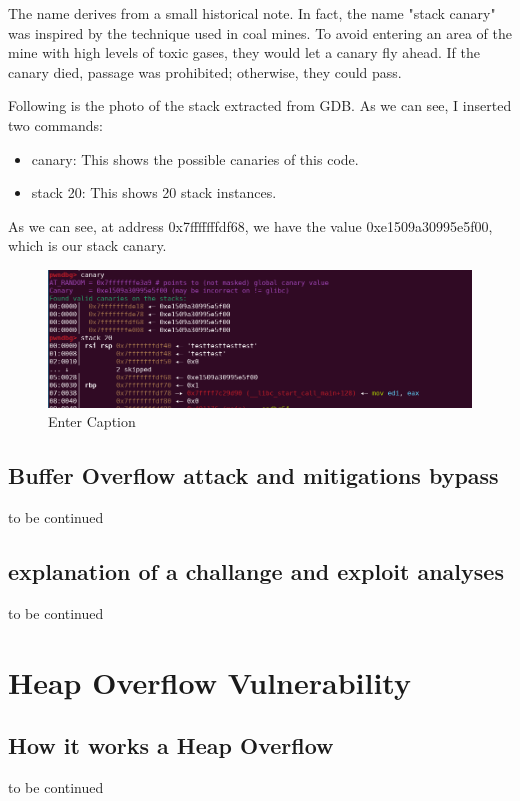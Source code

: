 \documentclass{report}
\begin{document}
    The name derives from a small historical note. In fact, the name "stack canary" was inspired by the technique used in coal mines.\newline
    To avoid entering an area of the mine with high levels of toxic gases, they would let a canary fly ahead. If the canary died, passage was prohibited; otherwise, they could pass.
    \clearpage
        
    Following is the photo of the stack extracted from GDB. As we can see, I inserted two commands:
    \begin{itemize}
      \item \hspace{1em} canary: This shows the possible canaries of this code.
      \item \hspace{1em} stack 20: This shows 20 stack instances.
    \end{itemize}
    As we can see, at address 0x7fffffffdf68, we have the value 0xe1509a30995e5f00, which is our stack canary.
    \begin{figure}
        \includegraphics[width=1.3\linewidth]{photo_of_the_stack_with_canary.png}
        \caption{Enter Caption}
        \label{fig: }
    \end{figure}
    \newpage

    \section{Buffer Overflow attack and mitigations bypass}
    to be continued
    \clearpage
    \section{explanation of a challange and exploit analyses}
    to be continued
    
    
    \chapter{Heap Overflow Vulnerability}
    \section{How it works a Heap Overflow}
    to be continued
    \clearpage
\end{document}
